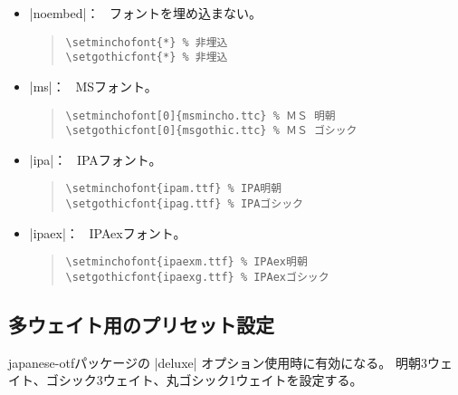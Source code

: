 \documentclass[uplatex,dvipdfmx,a4paper]{jsarticle}
\newcommand{\Pkg}[1]{\textsf{#1}}
\newcommand{\Means}{：\ }
\begin{document}
\begin{itemize}
\item |noembed|\Means
  フォントを埋め込まない。
\begin{quote}\small\begin{verbatim}
\setminchofont{*} % 非埋込
\setgothicfont{*} % 非埋込
\end{verbatim}\end{quote}

\item |ms|\Means
  MSフォント。
\begin{quote}\small\begin{verbatim}
\setminchofont[0]{msmincho.ttc} % ＭＳ 明朝
\setgothicfont[0]{msgothic.ttc} % ＭＳ ゴシック
\end{verbatim}\end{quote}

\item |ipa|\Means
  IPAフォント。
\begin{quote}\small\begin{verbatim}
\setminchofont{ipam.ttf} % IPA明朝
\setgothicfont{ipag.ttf} % IPAゴシック
\end{verbatim}\end{quote}

\item |ipaex|\Means
  IPAexフォント。
\begin{quote}\small\begin{verbatim}
\setminchofont{ipaexm.ttf} % IPAex明朝
\setgothicfont{ipaexg.ttf} % IPAexゴシック
\end{verbatim}\end{quote}
\end{itemize}

\subsection{多ウェイト用のプリセット設定}

\Pkg{japanese-otf}パッケージの |deluxe| オプション使用時に有効になる。
明朝3ウェイト、ゴシック3ウェイト、丸ゴシック1ウェイトを設定する。
\end{document}
